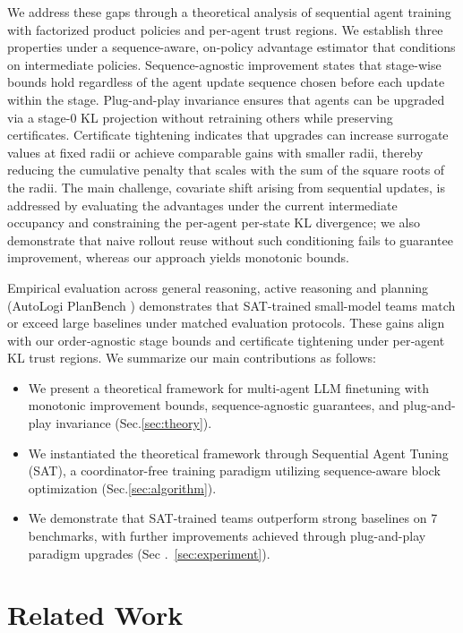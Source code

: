 \documentclass[sigconf]{aamas}
\begin{document}
We address these gaps through a theoretical analysis of sequential agent training with factorized product policies and per-agent trust regions. We establish three properties under a sequence-aware, on-policy advantage estimator that conditions on intermediate policies. Sequence-agnostic improvement states that stage-wise bounds hold regardless of the agent update sequence chosen before each update within the stage. Plug-and-play invariance ensures that agents can be upgraded via a stage-0 KL projection without retraining others while preserving certificates. Certificate tightening indicates that upgrades can increase surrogate values at fixed radii or achieve comparable gains with smaller radii, thereby reducing the cumulative penalty that scales with the sum of the square roots of the radii. The main challenge, covariate shift arising from sequential updates, is addressed by evaluating the advantages under the current intermediate occupancy and constraining the per-agent per-state KL divergence; we also demonstrate that naive rollout reuse without such conditioning fails to guarantee improvement, whereas our approach yields monotonic bounds.

Empirical evaluation across general reasoning, active reasoning and planning (AutoLogi PlanBench ) demonstrates that SAT-trained small-model teams match or exceed large baselines under matched evaluation protocols. These gains align with our order‑agnostic stage bounds and certificate tightening under per‑agent KL trust regions. We summarize our main contributions as follows:
\begin{itemize}
\item We present a theoretical framework for multi-agent LLM finetuning with monotonic improvement bounds, sequence-agnostic guarantees, and plug-and-play invariance (Sec.\ref{sec:theory}). 
\item We instantiated the theoretical framework through Sequential Agent Tuning (SAT), a coordinator-free training paradigm utilizing sequence-aware block optimization (Sec.\ref{sec:algorithm}).
 \item We demonstrate that SAT-trained teams outperform strong baselines on 7 benchmarks, with further improvements achieved through plug-and-play paradigm upgrades (Sec .~\ref {sec:experiment}).
\end{itemize}
\section{Related Work}
\end{document}
